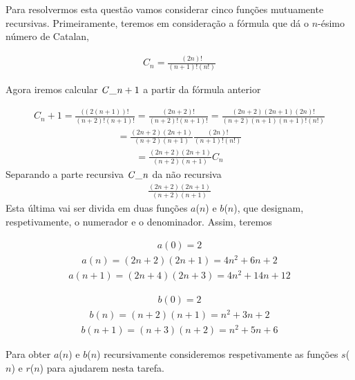 \documentclass[a4paper]{article}
\newcommand{\Conid}[1]{\mathit{#1}}
\newcommand{\Varid}[1]{\mathit{#1}}
\begin{document}
Para resolvermos esta questão vamos considerar cinco funções mutuamente recursivas. Primeiramente, teremos em consideração a 
fórmula que dá o \ensuremath{\Varid{n}}-ésimo número de Catalan,

\begin{eqnarray}
	C_n = \frac{(2n)!}{(n+1)! (n!) }
\end{eqnarray}

Agora iremos calcular \ensuremath{\Conid{C\char95 n}\mathbin{+}\mathrm{1}} a partir da fórmula anterior

\begin{eqnarray}
  C_n+1 = \frac{((2(n+1))!}{(n+2)! (n+1)! } = \frac{(2n+2)!}{(n+2)! (n+1)! } 
        = \frac{(2n+2) (2n+1) (2n)!}{(n+2) (n+1) (n+1)! (n!) } 
\end{eqnarray}
\begin{eqnarray}
        = \frac{(2n+2) (2n+1) } {(n+2) (n+1) } \frac{(2n)!} {(n+1)! (n!) }
\end{eqnarray}
\begin{eqnarray}
        = \frac{(2n+2) (2n+1)}{(n+2) (n+1) } C_n
\end{eqnarray}
Separando a parte recursiva \ensuremath{\Conid{C\char95 n}} da não recursiva 
\begin{eqnarray}
  \frac{(2n+2) (2n+1)}{(n+2) (n+1) } 
\end{eqnarray}
Esta última vai ser divida em duas funções \ensuremath{\Varid{a}}(\ensuremath{\Varid{n}}) e \ensuremath{\Varid{b}}(\ensuremath{\Varid{n}}), que designam, respetivamente, o numerador
e o denominador. Assim, teremos

\begin{eqnarray}
  a(0) = 2
\end{eqnarray} 
\begin{eqnarray}
  a(n) = (2n+2) (2n+1) = 4n^2 + 6n + 2
\end{eqnarray}
\begin{eqnarray}
  a(n+1) = (2n+4) (2n+3) = 4n^2 + 14n + 12
\end{eqnarray}

\begin{eqnarray}
  b(0) = 2
\end{eqnarray}
\begin{eqnarray}
  b(n) = (n+2) (n+1) = n^2 + 3n + 2
\end{eqnarray}
\begin{eqnarray}
  b(n+1) = (n+3) (n+2) = n^2 + 5n + 6
\end{eqnarray}

Para obter \ensuremath{\Varid{a}}(\ensuremath{\Varid{n}}) e \ensuremath{\Varid{b}}(\ensuremath{\Varid{n}}) recursivamente consideremos respetivamente as funções \ensuremath{\Varid{s}}(\ensuremath{\Varid{n}}) e \ensuremath{\Varid{r}}(\ensuremath{\Varid{n}})
para ajudarem nesta tarefa.
\end{document}
